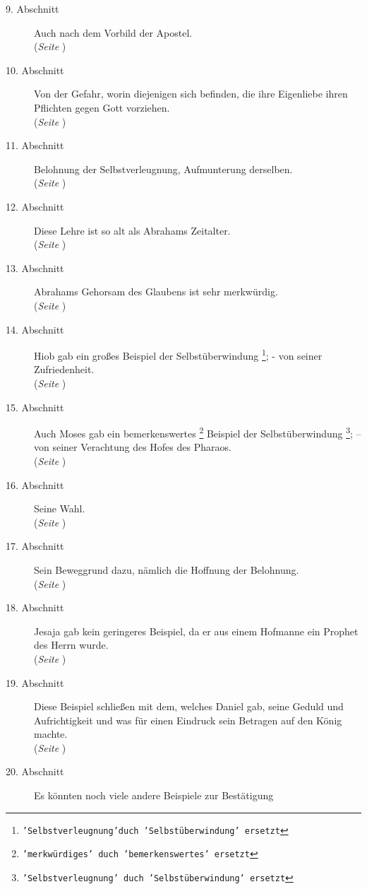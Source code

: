 \begin{description}
\item[9. Abschnitt] Auch nach dem Vorbild der Apostel.
\\(\textit{Seite \pageref{kap4_ab9}})
\item[10. Abschnitt] Von der Gefahr, worin diejenigen sich befinden, die ihre
Eigenliebe ihren Pflichten gegen Gott vorziehen.
\\(\textit{Seite \pageref{kap4_ab10}})
\item[11. Abschnitt] Belohnung der Selbstverleugnung, Aufmunterung derselben.
\\(\textit{Seite \pageref{kap4_ab11}})
\item[12. Abschnitt] Diese Lehre ist so alt als Abrahams Zeitalter.
\\(\textit{Seite \pageref{kap4_ab12}})
\item[13. Abschnitt] Abrahams Gehorsam des Glaubens ist sehr merkwürdig.
\\(\textit{Seite \pageref{kap4_ab13}})
\item[14. Abschnitt] Hiob gab ein großes Beispiel der Selbstüberwindung
\footnote{\texttt{'Selbstverleugnung'duch 'Selbstüberwindung' ersetzt}}; - von
seiner Zufriedenheit.
\\(\textit{Seite \pageref{kap4_ab14}})
\item[15. Abschnitt] Auch Moses gab ein bemerkenswertes
\footnote{\texttt{'merkwürdiges' duch 'bemerkenswertes' ersetzt}} Beispiel der
Selbstüberwindung \footnote{\texttt{'Selbstverleugnung' duch 'Selbstüberwindung'
ersetzt}}; -- von seiner Verachtung des Hofes des Pharaos.
\\(\textit{Seite \pageref{kap4_ab15}})
\item[16. Abschnitt] Seine Wahl.
\\(\textit{Seite \pageref{kap4_ab16}})
\item[17. Abschnitt] Sein Beweggrund dazu, nämlich die Hoffnung der Belohnung.
\\(\textit{Seite \pageref{kap4_ab17}})
\item[18. Abschnitt] Jesaja gab kein geringeres Beispiel, da er aus einem
Hofmanne ein Prophet des Herrn wurde.
\\(\textit{Seite \pageref{kap4_ab18}})
\item[19. Abschnitt] Diese Beispiel schließen mit dem, welches Daniel gab,
seine Geduld und Aufrichtigkeit und was für einen Eindruck sein Betragen auf
den König machte.
\\(\textit{Seite \pageref{kap4_ab19}})
\item[20. Abschnitt] Es könnten noch viele andere Beispiele zur Bestätigung

\end{description}
